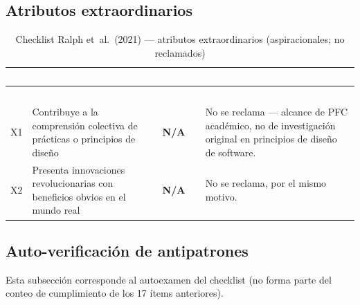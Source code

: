\subsection{Atributos extraordinarios}

\begin{center}
\scriptsize
\renewcommand{\arraystretch}{1.15}
\begin{longtable}{|p{0.7cm}|p{4.2cm}|p{1.6cm}|p{7.0cm}|}
\caption{Checklist Ralph et~al.\ (2021) --- atributos extraordinarios
  (aspiracionales; no reclamados)}
\label{tab:anexo-ralph-extraordinarios}\\
\hline
\rowcolor{verdeuteq}
\textcolor{white}{\textbf{\#}} &
\textcolor{white}{\textbf{Ítem}} &
\textcolor{white}{\textbf{Estado}} &
\textcolor{white}{\textbf{Nota}} \\
\hline
\endfirsthead
\hline
\rowcolor{verdeuteq}
\textcolor{white}{\textbf{\#}} &
\textcolor{white}{\textbf{Ítem}} &
\textcolor{white}{\textbf{Estado}} &
\textcolor{white}{\textbf{Nota}} \\
\hline
\endhead
\hline
\endfoot
X1 & Contribuye a la comprensión colectiva de prácticas o principios de diseño & \textbf{N/A} & No se reclama --- alcance de PFC académico, no de investigación original en principios de diseño de software. \\
\hline
X2 & Presenta innovaciones revolucionarias con beneficios obvios en el mundo real & \textbf{N/A} & No se reclama, por el mismo motivo. \\
\hline
\end{longtable}
\end{center}

\subsection{Auto-verificación de antipatrones}

Esta subsección corresponde al autoexamen del checklist (no forma parte
del conteo de cumplimiento de los 17 ítems anteriores).

